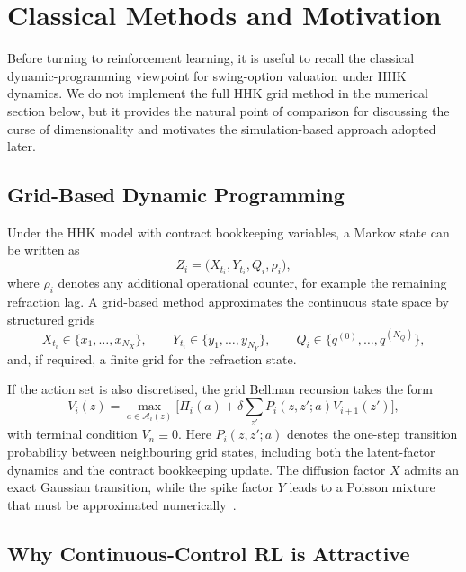 \documentclass[a4paper,fleqn]{cas-dc}
\begin{document}
\section{Classical Methods and Motivation}
\label{sec:classical_methods}

Before turning to reinforcement learning, it is useful to recall the classical dynamic-programming viewpoint for swing-option valuation under HHK dynamics. We do not implement the full HHK grid method in the numerical section below, but it provides the natural point of comparison for discussing the curse of dimensionality and motivates the simulation-based approach adopted later.

\subsection{Grid-Based Dynamic Programming}

Under the HHK model with contract bookkeeping variables, a Markov state can be written as
\[
Z_i = \bigl(X_{t_i},Y_{t_i},Q_i,\rho_i\bigr),
\]
where $\rho_i$ denotes any additional operational counter, for example the remaining refraction lag. A grid-based method approximates the continuous state space by structured grids
\[
X_{t_i} \in \{x_1,\dots,x_{N_X}\},
\qquad
Y_{t_i} \in \{y_1,\dots,y_{N_Y}\},
\qquad
Q_i \in \{q^{(0)},\dots,q^{(N_Q)}\},
\]
and, if required, a finite grid for the refraction state.

If the action set is also discretised, the grid Bellman recursion takes the form
\begin{equation}
\label{eq:grid_bellman}
V_i(z) = \max_{a \in \mathcal{A}_i(z)}
\biggl[
\Pi_i(a) + \delta
\sum_{z'} P_i(z,z';a) V_{i+1}(z')
\biggr],
\end{equation}
with terminal condition $V_n \equiv 0$. Here $P_i(z,z';a)$ denotes the one-step transition probability between neighbouring grid states, including both the latent-factor dynamics and the contract bookkeeping update. The diffusion factor $X$ admits an exact Gaussian transition, while the spike factor $Y$ leads to a Poisson mixture that must be approximated numerically~\cite{Hambly2009}.

\subsection{Why Continuous-Control RL is Attractive}
\end{document}

